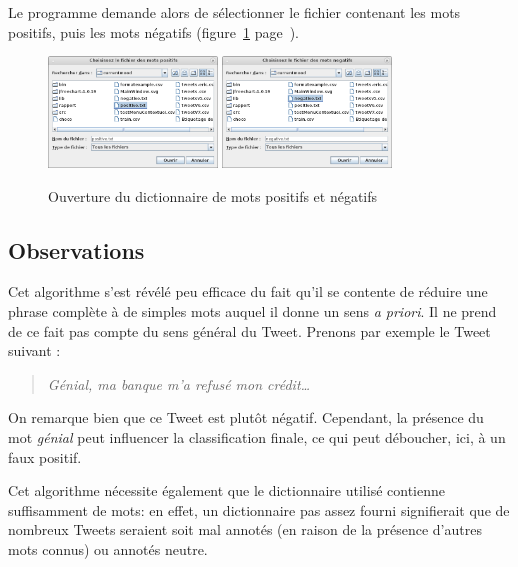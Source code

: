 \documentclass[12pt,a4paper]{report}
\begin{document}
Le programme demande alors de sélectionner le fichier contenant les mots
positifs, puis les mots négatifs (figure~\ref{ouvrir_dictionnaire}
page~\pageref{ouvrir_dictionnaire}).

\begin{figure}[h]
	\centering
	\includegraphics[width=0.4\textwidth]{img/capture_ouvrir-mots-positifs.png}
	\includegraphics[width=0.4\textwidth]{img/capture_ouvrir-mots-negatifs.png}
	\caption{Ouverture du dictionnaire de mots positifs et négatifs}
\label{ouvrir_dictionnaire}
\end{figure}

\newpage
\subsection{Observations}
Cet algorithme s'est révélé peu efficace du fait qu'il se contente de réduire
une phrase complète à de simples mots auquel il donne un sens \textit{a priori}.
Il ne prend de ce fait pas compte du sens général du Tweet. Prenons par exemple
le Tweet suivant :

\begin{quote}
	\textit{Génial, ma banque m'a refusé mon crédit…}
\end{quote}

On remarque bien que ce Tweet est plutôt négatif. Cependant, la présence du mot
\textit{génial} peut influencer la classification finale, ce qui peut déboucher,
ici, à un faux positif.

Cet algorithme nécessite également que le dictionnaire utilisé contienne
suffisamment de mots: en effet, un dictionnaire pas assez fourni signifierait
que de nombreux Tweets seraient soit mal annotés (en raison de la présence
d'autres mots connus) ou annotés neutre.
\end{document}
